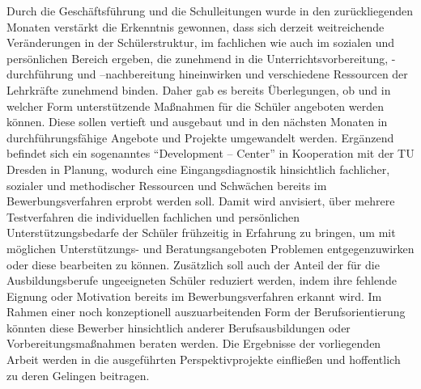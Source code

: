 Durch die Geschäftsführung und die Schulleitungen wurde in den zurückliegenden Monaten verstärkt die Erkenntnis gewonnen, dass sich derzeit weitreichende Veränderungen in der Schülerstruktur, im fachlichen wie auch im sozialen und persönlichen Bereich ergeben, die zunehmend in die Unterrichtsvorbereitung, -durchführung und –nachbereitung hineinwirken und verschiedene Ressourcen der Lehrkräfte zunehmend binden. Daher gab es bereits Überlegungen, ob und in welcher Form unterstützende Maßnahmen für die Schüler angeboten werden können. Diese sollen vertieft und ausgebaut und in den nächsten Monaten in durchführungsfähige Angebote und Projekte umgewandelt werden. Ergänzend befindet sich ein sogenanntes "`Development -- Center"' in Kooperation mit der TU Dresden in Planung, wodurch eine Eingangsdiagnostik hinsichtlich fachlicher, sozialer und methodischer Ressourcen und Schwächen bereits im Bewerbungsverfahren erprobt werden soll. Damit wird anvisiert, über mehrere Testverfahren die individuellen fachlichen und persönlichen Unterstützungsbedarfe der Schüler frühzeitig in Erfahrung zu bringen, um mit möglichen Unterstützungs- und Beratungsangeboten Problemen entgegenzuwirken oder diese bearbeiten zu können. Zusätzlich soll auch der Anteil der für die Ausbildungsberufe ungeeigneten Schüler reduziert werden, indem ihre fehlende Eignung oder Motivation bereits im Bewerbungsverfahren erkannt wird. Im Rahmen einer noch konzeptionell auszuarbeitenden Form der Berufsorientierung könnten diese Bewerber hinsichtlich anderer Berufsausbildungen oder Vorbereitungsmaßnahmen beraten werden. Die Ergebnisse der vorliegenden Arbeit werden in die ausgeführten Perspektivprojekte einfließen und hoffentlich zu deren Gelingen beitragen. 


